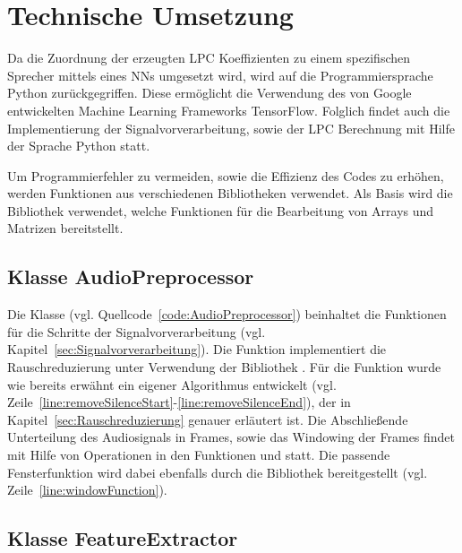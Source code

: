 \section{Technische Umsetzung}\label{sec:TechnischeUmsetzung}
Da die Zuordnung der erzeugten \ac{LPC} Koeffizienten zu einem spezifischen Sprecher mittels eines \acp{NN} umgesetzt wird, wird auf die Programmiersprache Python zurückgegriffen.
Diese ermöglicht die Verwendung des von Google entwickelten Machine Learning Frameworks TensorFlow.
Folglich findet auch die Implementierung der Signalvorverarbeitung, sowie der \ac{LPC} Berechnung mit Hilfe der Sprache Python statt.

Um Programmierfehler zu vermeiden, sowie die Effizienz des Codes zu erhöhen, werden Funktionen aus verschiedenen Bibliotheken verwendet.
Als Basis wird die Bibliothek  verwendet, welche Funktionen für die Bearbeitung von Arrays und Matrizen bereitstellt. 

\subsection{Klasse AudioPreprocessor}
Die Klasse  (vgl. Quellcode~\ref{code:AudioPreprocessor}) beinhaltet die Funktionen für die Schritte der Signalvorverarbeitung (vgl. Kapitel~\ref{sec:Signalvorverarbeitung}).
Die Funktion  implementiert die Rauschreduzierung unter Verwendung der Bibliothek .
Für die Funktion  wurde wie bereits erwähnt ein eigener Algorithmus entwickelt (vgl. Zeile~\ref{line:removeSilenceStart}-\ref{line:removeSilenceEnd}), der in Kapitel~\ref{sec:Rauschreduzierung} genauer erläutert ist.
Die Abschließende Unterteilung des Audiosignals in Frames, sowie das Windowing der Frames findet mit Hilfe von  Operationen in den Funktionen  und  statt.
Die passende Fensterfunktion wird dabei ebenfalls durch die   Bibliothek bereitgestellt (vgl. Zeile~\ref{line:windowFunction}).

\subsection{Klasse FeatureExtractor}
